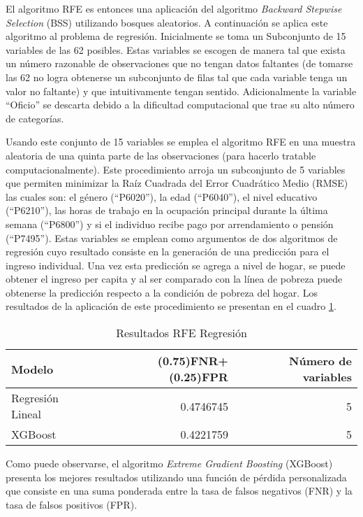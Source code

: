 \documentclass[11pt,a4paper]{article}
\begin{document}
El algoritmo RFE es entonces una aplicación del algoritmo \emph{Backward Stepwise Selection} (BSS) utilizando bosques aleatorios. A continuación se aplica este algoritmo al problema de regresión. Inicialmente se toma un Subconjunto de 15 variables de las 62 posibles. Estas variables se escogen de manera tal que exista un número razonable de observaciones que no tengan datos faltantes (de tomarse las 62 no logra obtenerse un subconjunto de filas tal que cada variable tenga un valor no faltante) y que intuitivamente tengan sentido. Adicionalmente la variable ``Oficio'' se descarta debido a la dificultad computacional que trae su alto número de categorías.

Usando este conjunto de 15 variables se emplea el algoritmo RFE en una muestra aleatoria de una quinta parte de las observaciones (para hacerlo tratable computacionalmente). Este procedimiento arroja un subconjunto de 5 variables que permiten minimizar la Raíz Cuadrada del Error Cuadrático Medio (RMSE) las cuales son: el género (``P6020''), la edad (``P6040''), el nivel educativo (``P6210''), las horas de trabajo en la ocupación principal durante la última semana (``P6800'') y si el individuo recibe pago por arrendamiento o pensión (``P7495''). Estas variables se emplean como argumentos de dos algoritmos de regresión cuyo resultado consiste en la generación de una predicción para el ingreso individual. Una vez esta predicción se agrega a nivel de hogar, se puede obtener el ingreso per capita y al ser comparado con la línea de pobreza puede obtenerse la predicción respecto a la condición de pobreza del hogar. Los resultados de la aplicación de este procedimiento se presentan en el cuadro \ref{tbl:rfe_reg}.

\begin{table}[H]
\caption{Resultados RFE Regresión}
\centering
\begin{tabular}{lrr}
\toprule
Modelo & (0.75)FNR+(0.25)FPR & Número de variables\\
\midrule
Regresión Lineal & 0.4746745 & 5\\
XGBoost & 0.4221759 & 5\\
\bottomrule
\end{tabular}
\label{tbl:rfe_reg}
\end{table}

Como puede observarse, el algoritmo \emph{Extreme Gradient Boosting} (XGBoost) presenta los mejores resultados utilizando una función de pérdida personalizada que consiste en una suma ponderada entre la tasa de falsos negativos (FNR) y la tasa de falsos positivos (FPR).
\end{document}
